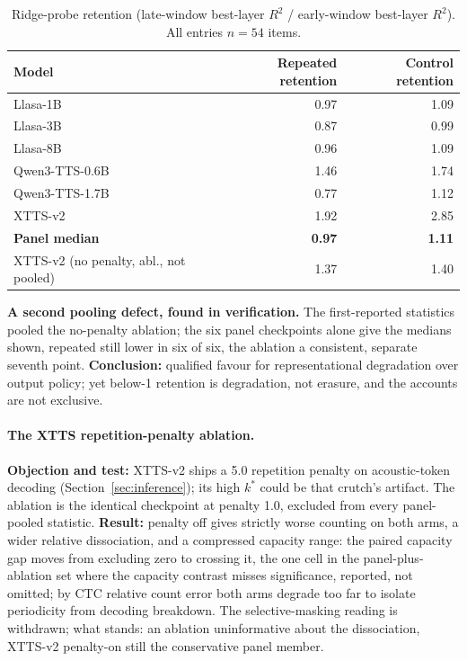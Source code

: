 \begin{table}[tp]
\centering
\caption{Ridge-probe retention (late-window best-layer $R^2$ / early-window best-layer $R^2$). All
entries $n{=}54$ items.}
\label{tab:proberet}
\small
\begin{tabular}{@{}lrr@{}}
\toprule
Model & Repeated retention & Control retention \\
\midrule
Llasa-1B & 0.97 & 1.09 \\
Llasa-3B & 0.87 & 0.99 \\
Llasa-8B & 0.96 & 1.09 \\
Qwen3-TTS-0.6B & 1.46 & 1.74 \\
Qwen3-TTS-1.7B & 0.77 & 1.12 \\
XTTS-v2 & 1.92 & 2.85 \\
\midrule
\textbf{Panel median} & \textbf{0.97} & \textbf{1.11} \\
XTTS-v2 (no penalty, abl., not pooled) & 1.37 & 1.40 \\
\bottomrule
\end{tabular}
\end{table}

\noindent\textbf{A second pooling defect, found in verification.} The first-reported statistics
pooled the no-penalty ablation; the six panel checkpoints alone give the medians shown, repeated
still lower in six of six, the ablation a consistent, separate seventh point.
\textbf{Conclusion:} qualified favour for representational degradation over output policy; yet
below-1 retention is degradation, not erasure, and the accounts are not exclusive.

\paragraph{The XTTS repetition-penalty ablation.} \textbf{Objection and test:} XTTS-v2 ships a
5.0 repetition penalty on acoustic-token decoding (Section~\ref{sec:inference}); its high
$k^\ast$ could be that crutch's artifact. The ablation is the identical checkpoint at penalty
1.0, excluded from every panel-pooled statistic. \textbf{Result:} penalty off gives strictly
worse counting on both arms, a wider relative dissociation, and a compressed capacity range:
the paired capacity gap moves from excluding zero to crossing it, the one cell in the
panel-plus-ablation set where the capacity contrast misses significance, reported, not omitted;
by CTC relative count error both arms degrade too far to isolate periodicity from decoding
breakdown. The selective-masking reading is withdrawn; what stands: an ablation uninformative
about the dissociation, XTTS-v2 penalty-on still the conservative panel member.

